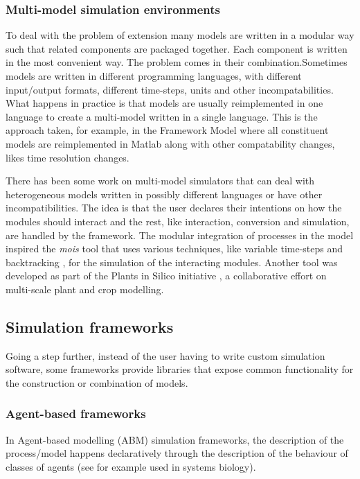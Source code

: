 \subsubsection{Multi-model simulation environments}
To deal with the problem of extension many models are written in a modular way
such that related components are packaged together. Each component is written in
the most convenient way. The problem comes in their combination.Sometimes models
are written in different programming languages, with different input/output
formats, different time-steps, units and other incompatabilities. What happens
in practice is that models are usually reimplemented in one language to create a
multi-model written in a single language. This is the approach taken, for
example, in the Framework Model where all constituent models are reimplemented
in Matlab along with other compatability changes, likes time resolution changes.

There has been some work on multi-model simulators that can deal with
heterogeneous models written in possibly different languages or have other
incompatibilities. The idea is that the user declares their intentions on how
the modules should interact and the rest, like interaction, conversion and
simulation, are handled by the framework. The modular integration of processes
in the \citet{karr_whole-cell_2012} model inspired the \emph{mois} tool
\citep{erbm_mois_2015} that uses various techniques, like variable time-steps
and backtracking \citep{bucher2013decomposition}, for the simulation of the
interacting modules. Another tool \citep{cis_2018} was developed as part of the
Plants in Silico initiative \citep{zhu_plants_2016}, a collaborative effort on
multi-scale plant and crop modelling.

\subsection{Simulation frameworks}
\label{sec:simFrameworks}
Going a step further, instead of the user having to write custom simulation
software, some frameworks provide libraries that expose common functionality for
the construction or combination of models.

\subsubsection*{Agent-based frameworks}
In Agent-based modelling (ABM) simulation frameworks, the description of the
process/model happens declaratively through the description of the behaviour of
classes of agents (see for example \cite{solovyev_spark:_2010} used in systems
biology).

